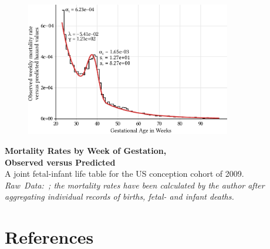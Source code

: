 \documentclass{beamer}
\begin{document}
\begin{frame}
\frametitle{\insertsection}

\begin{figure}[htb!]
\includegraphics[width = 0.8\textwidth]{./fig/us_fimort_2009_mx_predobs.pdf}\\
\end{figure}

\footnotesize\textbf{Mortality Rates by Week of Gestation,\\Observed versus Predicted}\\
A joint fetal-infant life table for the US conception cohort of 2009.\\
\scriptsize\emph{Raw~Data:~\textcite{DVS2015}; the mortality rates have been calculated by the author after aggregating individual records of births, fetal- and infant deaths.}

\end{frame}

\section{References} %

\begin{frame}
\frametitle{\insertsection}

\nocite{Hmd2015}

\printbibliography

\end{frame}
\end{document}
